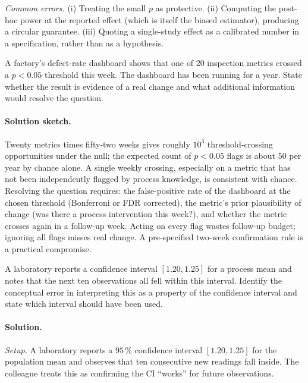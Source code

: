 \textit{Common errors.} (i) Treating the small $p$ as protective.
(ii) Computing the post-hoc power at the reported effect (which is
itself the biased estimator), producing a circular guarantee.
(iii) Quoting a single-study effect as a calibrated number in a
specification, rather than as a hypothesis.

\begin{exercise}
A factory's defect-rate dashboard shows that one of $20$ inspection
metrics crossed a $p < 0.05$ threshold this week. The dashboard
has been running for a year. State whether the result is evidence
of a real change and what additional information would resolve
the question.
\end{exercise}

\paragraph{Solution sketch.}
Twenty metrics times fifty-two weeks gives roughly $10^{3}$
threshold-crossing opportunities under the null; the expected
count of $p < 0.05$ flags is about $50$ per year by chance alone.
A single weekly crossing, especially on a metric that has not
been independently flagged by process knowledge, is consistent
with chance. Resolving the question requires: the false-positive
rate of the dashboard at the chosen threshold (Bonferroni or FDR
corrected), the metric's prior plausibility of change (was there a
process intervention this week?), and whether the metric crosses
again in a follow-up week. Acting on every flag wastes follow-up
budget; ignoring all flags misses real change. A pre-specified
two-week confirmation rule is a practical compromise.

\begin{exercise}
A laboratory reports a confidence interval $[1.20, 1.25]$ for a
process mean and notes that the next ten observations all fell
within this interval. Identify the conceptual error in interpreting
this as a property of the confidence interval and state which
interval should have been used.
\end{exercise}

\paragraph{Solution.}
\textit{Setup.} A laboratory reports a $95 \,\%$ confidence
interval $[1.20, 1.25]$ for the population mean and observes that
ten consecutive new readings fall inside. The colleague treats
this as confirming the CI ``works'' for future observations.


